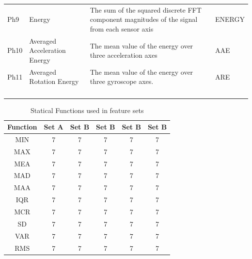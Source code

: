 \documentclass[journal,article,submit,moreauthors,pdftex]{Definitions/mdpi}
\begin{document}
\begin{table}[H]
\begin{tabular}{p{0.9cm}p{5cm}p{7cm}p{1.3cm}}
		Ph9&Energy&{\scriptsize The sum of the squared discrete FFT component magnitudes of the signal from each sensor axis} & ENERGY \\
		Ph10&Averaged Acceleration Energy&{\scriptsize The mean value of the energy over three acceleration axes} & AAE \\
		Ph11&Averaged Rotation Energy&{\scriptsize The mean value of the energy over three gyroscope axes. } & ARE \\
		&&{\scriptsize } & \\
		&&{\scriptsize } & \\
		&&{\scriptsize } & \\
		&&{\scriptsize } & \\
		\bottomrule
	\end{tabular}
	\label{features_table}
\end{table}
\begin{table}[H]
	\caption{Statical Functions used in feature sets}
	\centering
	\begin{tabular}{cccccc}
		\toprule
		\textbf{Function} & \textbf{Set A} & \textbf{Set B}& \textbf{Set B}& \textbf{Set B}& \textbf{Set B}\\
		\midrule
		MIN & 7& 7& 7& 7& 7\\
		MAX& 7& 7& 7& 7& 7\\
		MEA& 7& 7& 7& 7& 7\\
		MAD& 7& 7& 7& 7& 7\\
		MAA& 7& 7& 7& 7& 7\\
		IQR  & 7& 7& 7& 7& 7 \\
		MCR& 7& 7& 7& 7& 7\\
		SD& 7& 7& 7& 7& 7\\
		VAR& 7& 7& 7& 7& 7\\
		RMS& 7& 7& 7& 7& 7\\
		\bottomrule
	\end{tabular}
	\label{features_table}
\end{table}
\end{document}
